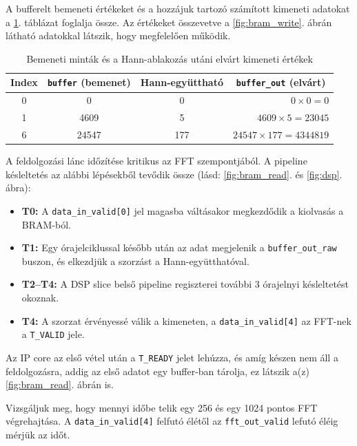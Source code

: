 \documentclass[12pt, a4paper]{article}
\begin{document}
A bufferelt bemeneti értékeket és a hozzájuk tartozó számított kimeneti adatokat a \ref{tab:buffer_values}. táblázat foglalja össze. Az értékeket összevetve a \ref{fig:bram_write}. ábrán látható adatokkal látszik, hogy megfelelően működik.

\begin{table}[ht]
\centering
\begin{tabular}{|c|c|c|r|}
\hline
Index & \texttt{buffer} (bemenet) & Hann-együttható & \multicolumn{1}{c|}{\texttt{buffer\_out} (elvárt)} \\ \hline
0     & 0     & 0   & $0 \times 0 = 0$               \\ \hline
1     & 4609  & 5   & $4609 \times 5 = 23045$        \\ \hline
6     & 24547 & 177 & $24547 \times 177 = 4344819$   \\ \hline
\end{tabular}
\caption{Bemeneti minták és a Hann-ablakozás utáni elvárt kimeneti értékek}
\label{tab:buffer_values}
\end{table}

A feldolgozási lánc időzítése kritikus az FFT szempontjából. A pipeline késleltetés az alábbi lépésekből tevődik össze (lásd: \ref{fig:bram_read}. és \ref{fig:dsp}. ábra):

\begin{itemize}
    \item \textbf{T0:} A \texttt{data\_in\_valid[0]} jel magasba váltásakor megkezdődik a kiolvasás a BRAM-ból.
    \item \textbf{T1:} Egy órajelciklussal később után az adat megjelenik a \texttt{buffer\_out\_raw} buszon, és elkezdjük a szorzást a Hann-együtthatóval.
    \item \textbf{T2--T4:} A DSP slice belső pipeline regiszterei további 3 órajelnyi késleltetést okoznak.
    \item \textbf{T4:} A szorzat érvényessé válik a kimeneten, a \texttt{data\_in\_valid[4]} az FFT-nek a \texttt{T\_VALID} jele.
\end{itemize}

Az IP core az első vétel után  a \texttt{T\_READY} jelet lehúzza, és amíg készen nem áll a feldolgozásra, addig az első adatot egy buffer-ban tárolja, ez látszik a(z) \ref{fig:bram_read}. ábrán is.

Vizsgáljuk meg, hogy mennyi időbe telik egy 256 és egy 1024 pontos FFT végrehajtása. A \texttt{data\_in\_valid[4]} felfutó élétől az \texttt{fft\_out\_valid} lefutó éléig mérjük az időt.
\end{document}
